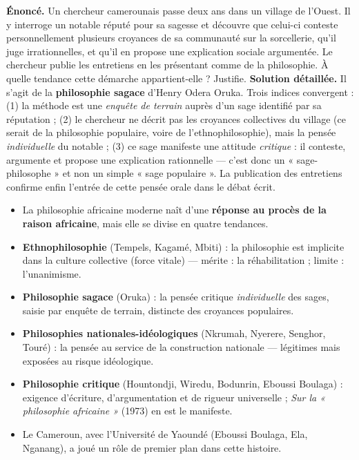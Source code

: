 \documentclass[11pt]{article}
\begin{document}
\begin{exoresolu}
\textbf{Énoncé.} Un chercheur camerounais passe deux ans dans un village de l'Ouest. Il y interroge un notable réputé pour sa sagesse et découvre que celui-ci conteste personnellement plusieurs croyances de sa communauté sur la sorcellerie, qu'il juge irrationnelles, et qu'il en propose une explication sociale argumentée. Le chercheur publie les entretiens en les présentant comme de la philosophie. À quelle tendance cette démarche appartient-elle ? Justifie.
\tcblower
\textbf{Solution détaillée.} Il s'agit de la \textbf{philosophie sagace} d'Henry Odera Oruka. Trois indices convergent : (1) la méthode est une \emph{enquête de terrain} auprès d'un sage identifié par sa réputation ; (2) le chercheur ne décrit pas les croyances collectives du village (ce serait de la philosophie populaire, voire de l'ethnophilosophie), mais la pensée \emph{individuelle} du notable ; (3) ce sage manifeste une attitude \emph{critique} : il conteste, argumente et propose une explication rationnelle — c'est donc un « sage-philosophe » et non un simple « sage populaire ». La publication des entretiens confirme enfin l'entrée de cette pensée orale dans le débat écrit.
\end{exoresolu}

\begin{aretenir}
\begin{itemize}
\item La philosophie africaine moderne naît d'une \textbf{réponse au procès de la raison africaine}, mais elle se divise en quatre tendances.
\item \textbf{Ethnophilosophie} (Tempels, Kagamé, Mbiti) : la philosophie est implicite dans la culture collective (force vitale) — mérite : la réhabilitation ; limite : l'unanimisme.
\item \textbf{Philosophie sagace} (Oruka) : la pensée critique \emph{individuelle} des sages, saisie par enquête de terrain, distincte des croyances populaires.
\item \textbf{Philosophies nationales-idéologiques} (Nkrumah, Nyerere, Senghor, Touré) : la pensée au service de la construction nationale — légitimes mais exposées au risque idéologique.
\item \textbf{Philosophie critique} (Hountondji, Wiredu, Bodunrin, Eboussi Boulaga) : exigence d'écriture, d'argumentation et de rigueur universelle ; \emph{Sur la « philosophie africaine »} (1973) en est le manifeste.
\item Le Cameroun, avec l'Université de Yaoundé (Eboussi Boulaga, Ela, Nganang), a joué un rôle de premier plan dans cette histoire.
\end{itemize}
\end{aretenir}
\end{document}
